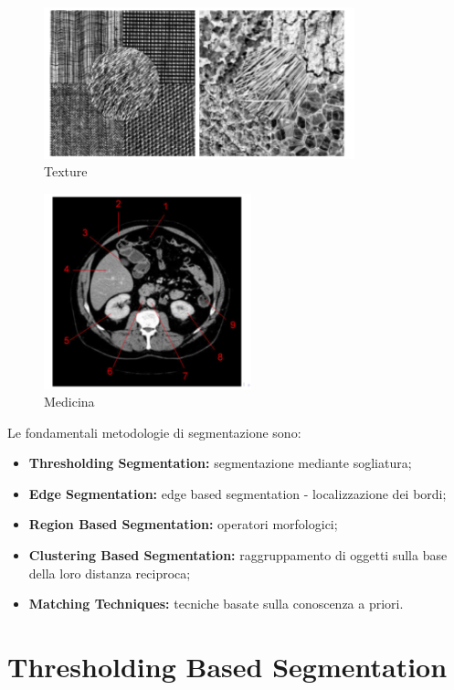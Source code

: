 \begin{figure}[H]
    \centering
    \includegraphics[width=9cm, keepaspectratio]{capitoli/immagini/imgs/texture.png}
    \caption{Texture}
\end{figure}

\begin{figure}[H]
    \centering
    \includegraphics[width=6cm, keepaspectratio]{capitoli/immagini/imgs/medicina.png}
    \caption{Medicina}
\end{figure}


Le fondamentali metodologie di segmentazione sono:
\begin{itemize}
    \item \textbf{Thresholding Segmentation:} segmentazione mediante
          sogliatura;
    \item \textbf{Edge Segmentation:} edge based segmentation - localizzazione
          dei bordi;
    \item \textbf{Region Based Segmentation:} operatori morfologici;
    \item \textbf{Clustering Based Segmentation:} raggruppamento di oggetti
          sulla base della loro distanza reciproca;
    \item \textbf{Matching Techniques:} tecniche basate sulla conoscenza a
          priori.
\end{itemize}

\section{Thresholding Based Segmentation}

